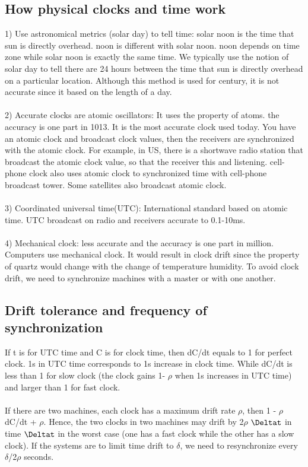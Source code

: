 \documentclass[twoside]{article}
\begin{document}
\subsection{How physical clocks and time work}
1) Use astronomical metrics (solar day) to tell time: solar noon is the time that sun is directly overhead. noon is different with solar noon. noon depends on time zone while solar noon is exactly the same time. We typically use the notion of solar day to tell there are 24 hours between the time that sun is directly overhead on a particular location. Although this method is used for century, it is not accurate since it based on the length of a day.\\\\
2) Accurate clocks are atomic oscillators: It uses the property of atoms. the accuracy is one part in 1013. It is the most accurate clock used today. You have an atomic clock and broadcast clock values, then the receivers are synchronized with the atomic clock. For example, in US, there is a shortwave radio station that broadcast the atomic clock value, so that the receiver this and listening. cell-phone clock also uses atomic clock to synchronized time with cell-phone broadcast tower. Some satellites also broadcast atomic clock.\\\\
3) Coordinated universal time(UTC): International standard based on atomic time. UTC broadcast on radio and receivers accurate to 0.1-10ms.\\\\
4) Mechanical clock: less accurate and the accuracy is one part in million. Computers use mechanical clock. It would result in clock drift since the property of quartz would change with the change of temperature humidity. To avoid clock drift, we need to synchronize machines with a master or with one another.


\subsection{Drift tolerance and frequency of synchronization}
If t is for UTC time and C is for clock time, then dC/dt equals to 1 for perfect clock. 1s in UTC time corresponds to 1s increase in clock time. While dC/dt is less than 1 for slow clock (the clock gains 1- $\rho$ when 1s increases in UTC time) and larger than 1 for fast clock.\\\\ 

If there are two machines, each clock has a maximum drift rate $\rho$, then 1 - $\rho$ \leq dC/dt  + $\rho$. Hence, the two clocks in two machines may drift by 2$\rho$ $\Deltat$ in time $\Deltat$ in the worst case (one has a fast clock while the other has a slow clock). If the systems are to limit time drift to $\delta$, we need to resynchronize every $\delta$/2$\rho$ seconds.
\end{document}
